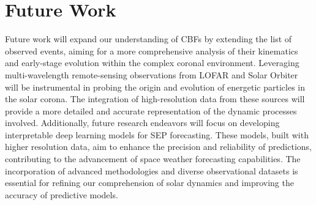 \section{Future Work}
Future work will expand our understanding of CBFs by extending the list of observed events, aiming for a more comprehensive analysis of their kinematics and early-stage evolution within the complex coronal environment. Leveraging multi-wavelength remote-sensing observations from LOFAR and Solar Orbiter will be instrumental in probing the origin and evolution of energetic particles in the solar corona. The integration of high-resolution data from these sources will provide a more detailed and accurate representation of the dynamic processes involved. Additionally, future research endeavors will focus on developing interpretable deep learning models for SEP forecasting. These models, built with higher resolution data, aim to enhance the precision and reliability of predictions, contributing to the advancement of space weather forecasting capabilities. The incorporation of advanced methodologies and diverse observational datasets is essential for refining our comprehension of solar dynamics and improving the accuracy of predictive models.

%
%
%
%
%
%
%

